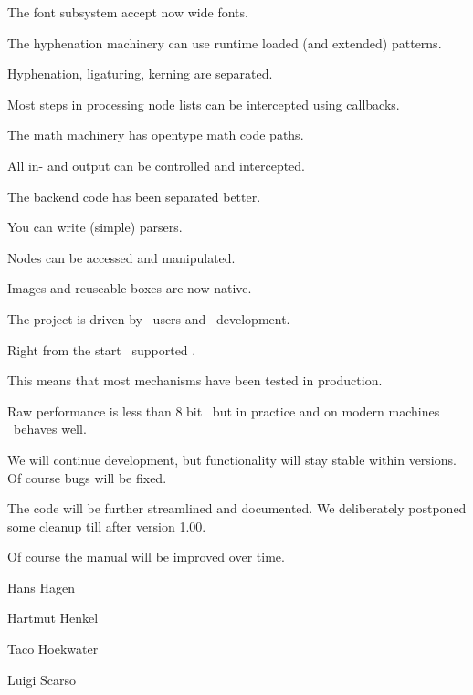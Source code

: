 \stopstandardmakeup

\startstandardmakeup

The font subsystem accept now wide fonts.

The hyphenation machinery can use runtime loaded (and extended) patterns.

Hyphenation, ligaturing, kerning are separated.

Most steps in processing node lists can be intercepted using callbacks.

The math machinery has opentype math code paths.

\stopstandardmakeup

\startstandardmakeup

All in- and output can be controlled and intercepted.

The backend code has been separated better.

You can write (simple) parsers.

Nodes can be accessed and manipulated.

Images and reuseable boxes are now native.

\stopstandardmakeup

\startstandardmakeup

The project is driven by \ConTeXt\ users and \ConTeXt\ development.

Right from the start \ConTeXt\ supported \LuaTeX.

This means that most mechanisms have been tested in production.

Raw performance is less than 8 bit \pdfTeX\ but in practice and on modern
machines \LuaTeX\ behaves well.

\stopstandardmakeup

\startstandardmakeup

We will continue development, but functionality will stay stable within versions.
Of course bugs will be fixed.

The code will be further streamlined and documented. We deliberately postponed some
cleanup till after version 1.00.

Of course the manual will be improved over time.

\stopstandardmakeup

\startstandardmakeup[bottom=,top=]

    \vfil

    \ssbf

    Hans Hagen     \par
    Hartmut Henkel \par
    Taco Hoekwater \par
    Luigi Scarso   \par

